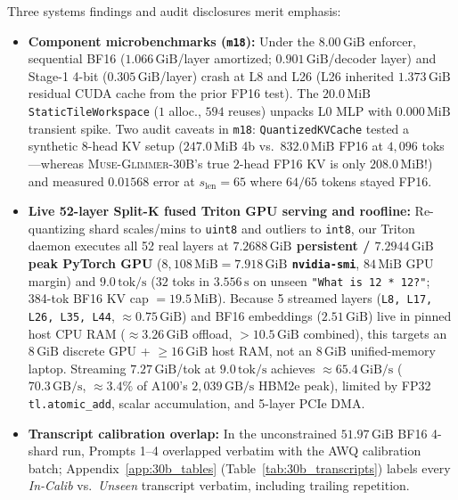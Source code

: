 \documentclass[10pt]{article} %
\newcommand{\glimmer}{\textsc{Muse-Glimmer-30B}}
\begin{document}
Three systems findings and audit disclosures merit emphasis:
\begin{itemize}[leftmargin=*,nosep]
    \item \textbf{Component microbenchmarks (\texttt{m18}):} Under the $8.00\,\text{GiB}$ enforcer, sequential BF16 ($1.066\,\text{GiB}$/layer amortized; $0.901\,\text{GiB}$/decoder layer) and Stage-1 4-bit ($0.305\,\text{GiB}$/layer) crash at L8 and L26 (L26 inherited $1.373\,\text{GiB}$ residual CUDA cache from the prior FP16 test). The $20.0\,\text{MiB}$ \texttt{StaticTileWorkspace} ($1$ alloc., $594$ reuses) unpacks L0 MLP with $0.000\,\text{MiB}$ transient spike. Two audit caveats in \texttt{m18}: \texttt{QuantizedKVCache} tested a synthetic $8$-head KV setup ($247.0\,\text{MiB}$ 4b vs.\ $832.0\,\text{MiB}$ FP16 at $4{,}096$ toks---whereas \glimmer{}'s true $2$-head FP16 KV is only $208.0\,\text{MiB}$!) and measured $0.01568$ error at $s_{\text{len}}=65$ where $64/65$ tokens stayed FP16.
    \item \textbf{Live 52-layer Split-K fused Triton GPU serving and roofline:} Re-quantizing shard scales/mins to \texttt{uint8} and outliers to \texttt{int8}, our Triton daemon executes all 52 real layers at \textbf{$7.2688\,\text{GiB}$ persistent / $7.2944\,\text{GiB}$ peak PyTorch GPU} (\textbf{$8{,}108\,\text{MiB} = 7.918\,\text{GiB}$ \texttt{nvidia-smi}}, $84\,\text{MiB}$ GPU margin) and \textbf{$9.0\,\text{tok/s}$} ($32$ toks in $3.556\,\text{s}$ on unseen \texttt{"What is 12 * 12?"}; 384-tok BF16 KV cap $= 19.5\,\text{MiB}$). Because 5 streamed layers (\texttt{L8, L17, L26, L35, L44}, $\approx 0.75\,\text{GiB}$) and BF16 embeddings ($2.51\,\text{GiB}$) live in pinned host CPU RAM ($\approx 3.26\,\text{GiB}$ offload, $>10.5\,\text{GiB}$ combined), this targets an $8\,\text{GiB}$ discrete GPU + $\ge 16\,\text{GiB}$ host RAM, not an $8\,\text{GiB}$ unified-memory laptop. Streaming $7.27\,\text{GiB}$/tok at $9.0\,\text{tok/s}$ achieves $\approx 65.4\,\text{GiB/s}$ ($70.3\,\text{GB/s}$, $\approx 3.4\%$ of A100's $2{,}039\,\text{GB/s}$ HBM2e peak), limited by FP32 \texttt{tl.atomic\_add}, scalar accumulation, and 5-layer PCIe DMA.
    \item \textbf{Transcript calibration overlap:} In the unconstrained $51.97\,\text{GiB}$ BF16 4-shard run, Prompts 1--4 overlapped verbatim with the AWQ calibration batch; Appendix~\ref{app:30b_tables} (Table~\ref{tab:30b_transcripts}) labels every \emph{In-Calib} vs.\ \emph{Unseen} transcript verbatim, including trailing repetition.
\end{itemize}
\end{document}
